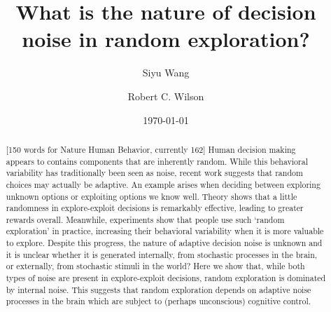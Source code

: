 \documentclass[12pt]{article}
\title{What is the nature of decision noise in random exploration?}
\author[1]{Siyu Wang}
\author[1,2]{Robert C. Wilson}
\affil[1]{Department of Psychology, University of Arizona, Tucson AZ USA}
\affil[2]{Cognitive Science Program, University of Arizona, Tucson AZ USA}
\date{\today}
\begin{document}
	\maketitle
	
	\newpage
	\begin{abstract}
	[150 words for Nature Human Behavior, currently 162]
	Human decision making appears to contains components that are inherently random. While this behavioral variability has traditionally been seen as noise, recent work suggests that random choices may actually be adaptive. An example arises when deciding between exploring unknown options or exploiting options we know well. Theory shows that a little randomness in explore-exploit decisions is remarkably effective, leading to greater rewards overall. Meanwhile, experiments show that people use such `random exploration' in practice,  increasing their behavioral variability when it is more valuable to explore. Despite this progress, the nature of adaptive decision noise is unknown and it is unclear whether it is generated internally, from stochastic processes in the brain, or externally, from stochastic stimuli in the world? Here we show that, while both types of noise are present in explore-exploit decisions, random exploration is dominated by internal noise. This suggests that random exploration depends on adaptive noise processes in the brain which are subject to (perhaps unconscious) cognitive control.
	
	
	
	
	

\end{abstract}
\end{document}
